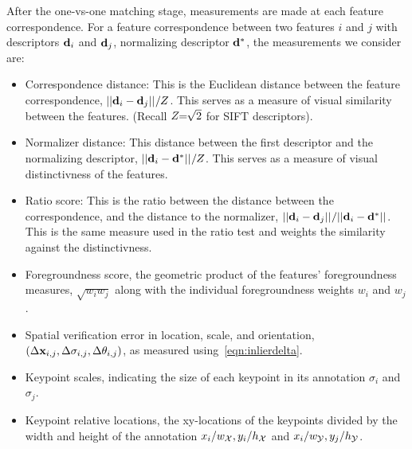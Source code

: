 After the one-vs-one matching stage, measurements are made at each feature
  correspondence.
For a feature correspondence between two features $i$ and $j$ with descriptors
  $\mathbf{d}_i$ and $\mathbf{d}_j$, normalizing descriptor $\mathbf{d}^{*}$, the measurements
  we consider are:
\begin{itemize}

    \item Correspondence distance:
        This is the Euclidean distance between the feature correspondence,
        $||\mathbf{d}_i - \mathbf{d}_j||_{} / Z$. This serves as a measure of visual
        similarity between the features. (Recall $Z\mkern-6mu=\mkern-6mu\sqrt{2}$ for SIFT
        descriptors).

    \item Normalizer distance:
        This distance between the first descriptor and the normalizing descriptor,
        $||\mathbf{d}_i - \mathbf{d}^{*}||_{} / Z$.
        This serves as a measure of visual distinctivness of the features.

    \item Ratio score:
        This is the ratio between the distance between the correspondence, and 
        the distance to the normalizer, %
        $||\mathbf{d}_i - \mathbf{d}_j||_{} / ||\mathbf{d}_i - \mathbf{d}^{*}||_{}$. This is the
        same measure used in the ratio test and weights the similarity against
        the distinctivness.

    \item Foregroundness score, the geometric product of the
        features' foregroundness measures, $\sqrt{w_i w_j}$ along with the
        individual foregroundness weights $w_i$ and $w_j$.
        
    \item Spatial verification error in location, scale, and orientation,
        $( %
        \Delta \pt_{i, j}, %
        \Delta \scale_{i, j}, %
        \Delta \ori_{i, j})$, as measured using~\cref{eqn:inlierdelta}.

    \item Keypoint scales, indicating the size of each keypoint in its
        annotation $\sigma_i$ and $\sigma_j$.

    \item Keypoint relative locations, the xy-locations of the keypoints
        divided by the width and height of the annotation 
         $x_i / w_{\mathcal{X}}, y_i / h_{\mathcal{X}}$ and
         $x_i / w_{\mathcal{Y}}, y_j / h_{\mathcal{Y}}$.
\end{itemize}

